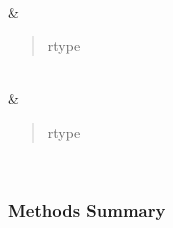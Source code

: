 \documentclass[letterpaper,10pt,english]{sphinxmanual}
\begin{document}
\begin{fulllineitems}
\begin{savenotes}
\begin{longtable}[c]{}
\begin{quote}
\begin{description}
\end{description}\end{quote}

\\
\hline
\sphinxAtStartPar
{\hyperref[\detokenize{api/seyfert.cosmology.bias.EuclidFlagshipGCphBias:seyfert.cosmology.bias.EuclidFlagshipGCphBias.Cph}]{}}
&
\sphinxAtStartPar
\begin{quote}\begin{description}
\item[{rtype}] \leavevmode
\sphinxAtStartPar
{}

\end{description}\end{quote}

\\
\hline
\sphinxAtStartPar
{\hyperref[\detokenize{api/seyfert.cosmology.bias.EuclidFlagshipGCphBias:seyfert.cosmology.bias.EuclidFlagshipGCphBias.Dph}]{}}
&
\sphinxAtStartPar
\begin{quote}\begin{description}
\item[{rtype}] \leavevmode
\sphinxAtStartPar
{}

\end{description}\end{quote}

\\
\hline
\end{longtable}\sphinxatlongtableend\end{savenotes}
\subsubsection*{Methods Summary}


\begin{savenotes}\sphinxatlongtablestart\begin{longtable}[c]{}
\hline

\endfirsthead

%
{}\\
\hline

\endhead

\hline
{}\\
\endfoot


\end{longtable}
\end{savenotes}
\end{fulllineitems}
\end{document}
